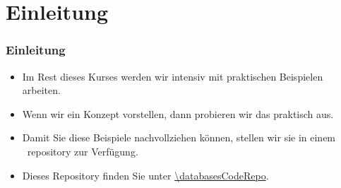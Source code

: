 \documentclass[aspectratio=169,mathserif,notheorems]{beamer}%
\subtitle{7.~Beispiele Herunterladen}%
\begin{document}
%
%
\startPresentation%
%
\section{Einleitung}%
%
\begin{frame}%
\frametitle{Einleitung}%
\begin{itemize}%
\item Im Rest dieses Kurses werden wir intensiv mit praktischen Beispielen arbeiten.%
\item<2-> Wenn wir ein Konzept vorstellen, dann probieren wir das praktisch aus.%
\item<3-> Damit Sie diese Beispiele nachvollziehen können, stellen wir sie in einem \github\ repository zur Verfügung.%
\item<4-> Dieses Repository finden Sie unter \expandafter\url{\databasesCodeRepo}.%
\end{itemize}%
\end{frame}%
%
\end{document}
